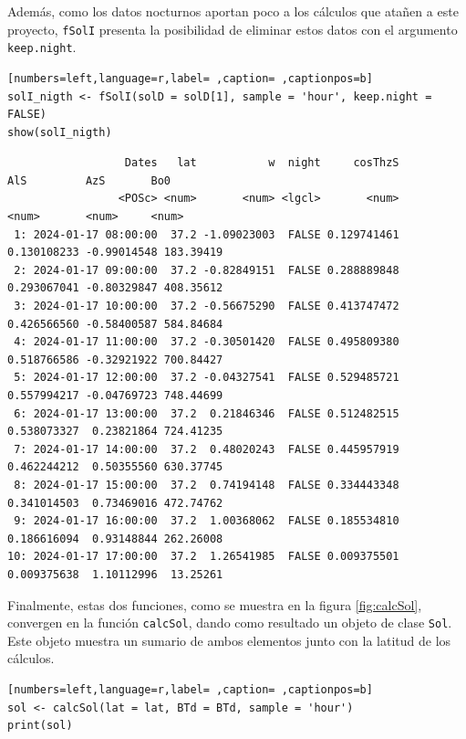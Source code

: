Además, como los datos nocturnos aportan poco a los cálculos que atañen a este proyecto, \texttt{fSolI} presenta la posibilidad de eliminar estos datos con el argumento \texttt{keep.night}.
\begin{lstlisting}[numbers=left,language=r,label= ,caption= ,captionpos=b]
solI_nigth <- fSolI(solD = solD[1], sample = 'hour', keep.night = FALSE)
show(solI_nigth)
\end{lstlisting}

\begin{verbatim}
                  Dates   lat           w  night     cosThzS         AlS         AzS       Bo0
                 <POSc> <num>       <num> <lgcl>       <num>       <num>       <num>     <num>
 1: 2024-01-17 08:00:00  37.2 -1.09023003  FALSE 0.129741461 0.130108233 -0.99014548 183.39419
 2: 2024-01-17 09:00:00  37.2 -0.82849151  FALSE 0.288889848 0.293067041 -0.80329847 408.35612
 3: 2024-01-17 10:00:00  37.2 -0.56675290  FALSE 0.413747472 0.426566560 -0.58400587 584.84684
 4: 2024-01-17 11:00:00  37.2 -0.30501420  FALSE 0.495809380 0.518766586 -0.32921922 700.84427
 5: 2024-01-17 12:00:00  37.2 -0.04327541  FALSE 0.529485721 0.557994217 -0.04769723 748.44699
 6: 2024-01-17 13:00:00  37.2  0.21846346  FALSE 0.512482515 0.538073327  0.23821864 724.41235
 7: 2024-01-17 14:00:00  37.2  0.48020243  FALSE 0.445957919 0.462244212  0.50355560 630.37745
 8: 2024-01-17 15:00:00  37.2  0.74194148  FALSE 0.334443348 0.341014503  0.73469016 472.74762
 9: 2024-01-17 16:00:00  37.2  1.00368062  FALSE 0.185534810 0.186616094  0.93148844 262.26008
10: 2024-01-17 17:00:00  37.2  1.26541985  FALSE 0.009375501 0.009375638  1.10112996  13.25261
\end{verbatim}

Finalmente, estas dos funciones, como se muestra en la figura \ref{fig:calcSol}, convergen en la función \texttt{calcSol}, dando como resultado un objeto de clase \texttt{Sol}. Este objeto muestra un sumario de ambos elementos junto con la latitud de los cálculos.
\begin{lstlisting}[numbers=left,language=r,label= ,caption= ,captionpos=b]
sol <- calcSol(lat = lat, BTd = BTd, sample = 'hour')
print(sol)
\end{lstlisting}

